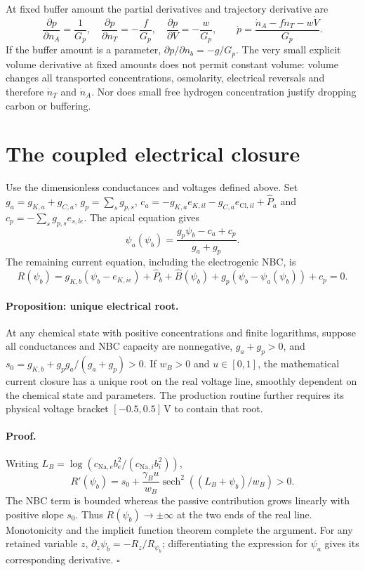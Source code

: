 At fixed buffer amount the partial derivatives and trajectory derivative
are
\begin{equation}
 \frac{\partial p}{\partial n_A}=\frac1{G_p},\quad
 \frac{\partial p}{\partial n_T}=-\frac f{G_p},\quad
 \frac{\partial p}{\partial V}=-\frac w{G_p},\qquad
 \dot p=\frac{\dot n_A-f\dot n_T-w\dot V}{G_p}.
 \label{m44eq:ph-derivatives}
\end{equation}
If the buffer amount is a parameter, $\partial p/\partial n_b=-g/G_p$.
The very small explicit volume derivative at fixed amounts does not permit
constant volume: volume changes all transported concentrations, osmolarity,
electrical reversals and therefore $\dot n_T$ and $\dot n_A$.  Nor does
small free hydrogen concentration justify dropping carbon or buffering.

\section{The coupled electrical closure}
\label{m44sec:electrical-proof}
Use the dimensionless conductances and voltages defined above.  Set
$g_a=g_{K,a}+g_{C,a}$, $g_p=\sum_sg_{p,s}$,
$c_a=-g_{K,a}e_{K,il}-g_{C,a}e_{\mathrm{Cl},il}+\widehat P_a$
and $c_p=-\sum_sg_{p,s}e_{s,le}$.  The apical equation gives
\[
 \psi_a(\psi_b)=\frac{g_p\psi_b-c_a+c_p}{g_a+g_p}.
\]
The remaining current equation, including the electrogenic NBC, is
\begin{equation}
 R(\psi_b)=g_{K,b}(\psi_b-e_{K,ie})+\widehat P_b
      +\widehat B(\psi_b)+g_p(\psi_b-\psi_a(\psi_b))+c_p=0.
 \label{m44eq:electrical-scalar}
\end{equation}

\paragraph{Proposition: unique electrical root.}
At any chemical state with positive concentrations and finite logarithms,
suppose all conductances and NBC capacity are nonnegative,
$g_a+g_p>0$, and
$s_0=g_{K,b}+g_pg_a/(g_a+g_p)>0$.  If $w_B>0$ and $u\in[0,1]$,
the mathematical current closure has a unique root on the real voltage
line, smoothly dependent on the chemical state and parameters.  The
production routine further requires its physical voltage bracket
$[-0.5,0.5]\,\mathrm V$ to contain that root.

\paragraph{Proof.}
Writing $L_B=\log(c_{\mathrm{Na},e}b_e^2/(c_{\mathrm{Na},i}b_i^2))$,
\[
 R'(\psi_b)=s_0+\frac{\gamma_Bu}{w_B}
       \operatorname{sech}^2((L_B+\psi_b)/w_B)>0.
\]
The NBC term is bounded whereas the passive contribution grows linearly
with positive slope $s_0$.  Thus $R(\psi_b)\to\pm\infty$ at the two
ends of the real line.  Monotonicity and the implicit function theorem
complete the argument.  For any retained variable $z$,
$\partial_z\psi_b=-R_z/R_{\psi_b}$; differentiating the expression
for $\psi_a$ gives its corresponding derivative. $\square$

